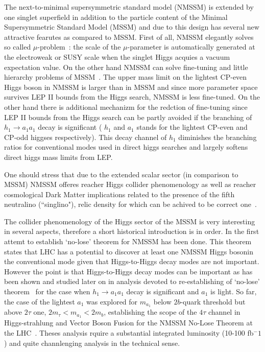 \documentclass[aps,12pt,superscriptaddress,nofootinbib,floatfix,showpacs]{revtex4}
\begin{document}
The next-to-minimal supersymmetric standard model (NMSSM)
\cite{Nilles:1982dy,Frere:1983ag,Ellis:1988er,%
Drees:1988fc,Ellwanger:1993hn,Ellwanger:1993xa,%
Elliott:1993bs,Pandita:1993tg,Ellwanger:1995ru,%
King:1995vk,Franke:1995tc,Ellwanger:1996gw,Miller:2003ay}
is extended by one singlet superfield in addition to the particle content
of the Minimal Supersymmetric Standard Model (MSSM)
and due to this design 
has several new attractive fearutes as compared to MSSM.
First  of all, NMSSM elegantly solves so called $\mu$-problem~\cite{mu-problem}:
the scale of the $\mu$-parameter is automatically generated 
at the electroweak or SUSY  scale when the singlet Higgs acquies 
a vacuum expectation value.
On the other hand NMSSM can solve fine-tuning and little hierarchy problems
of MSSM~\cite{Dermisek:2005ar}.
The upper mass limit on the lightest  CP-even
Higgs boson in NMSSM is larger than in MSSM and since more
parameter space survives LEP II bounds from the Higgs search,  NMSSM
is less fine-tuned.
On the other hand  there is additional mechanizm for the redction of
fine-tuning since 
LEP II bounds from the Higgs search can be partly avoided if the
branching of  $h_1\to a_1 a_1$ decay is significant ( $h_1$ and
$a_1$ stands for the lightest   CP-even  and CP-odd higgses respectively).
This decay channel of $h_1$ diminishes the branching ratios for
conventional modes used in direct higgs  searches and largely softens
direct higgs mass limits from LEP. 

One should stress that due to the extended scalar sector (in comparison to MSSM)
NMSSM offeres reacher Higgs collider phenomenology
\cite{nmssm-ph1,nmssm-ph2,%
nmssm-ph2b,nmssm-ph3,nmssm-ph4,%
nmssm-ph5,nmssm-ph6,nmssm-ph6a,nmssm-ph7}
as well as reacher  cosmological Dark Matter implications 
related to the presence of the fifth  neutralino (``singlino"),
relic density for  which can be achived to be correct one~\cite{nmssm-dm}.

The collider phenomenology of the Higgs sector of the MSSM
is very interesting in several aspects, therefore a short historical 
introduction is in  order.
In \cite{nmssm-ph2} the first attemt to establish `no-lose' theorem for NMSSM
has been done. This theorem states that LHC has a potential to discover at least one
NMSSM Higgs bosonin the conventional mode given that Higgs-to-Higgs decay modes 
are not important. However the point is that  Higgs-to-Higgs decay modes
can be important as has been shown and studied later on
in analysis devoted to re-establishing   of `no-lose' 
theorem~\cite{nmssm-ph2b,nmssm-ph3,nmssm-ph4,nmssm-ph5,nmssm-ph6,nmssm-ph6a,nmssm-ph7}
for the case when  $h_1\to a_1 a_1$ decay is significant
and $a_1$ is light. So far, the case of the lightest $a_1$  was explored 
for $m_{a_1}$ below $2b$-quark threshold but above $2\tau$ one,
$2m_\tau <m_{a_1}<2m_b$, establishing the scope of
the $4\tau$ channel in Higgs-strahlung and Vector Boson Fusion
for the NMSSM No-Lose Theorem at the LHC~\cite{nmssm-ph7}.
Theses analysis  rquire a substantial integrated luminosity (10-100 fb$^-1$)
and quite channlenging analysis in the technical sense.
\end{document}
